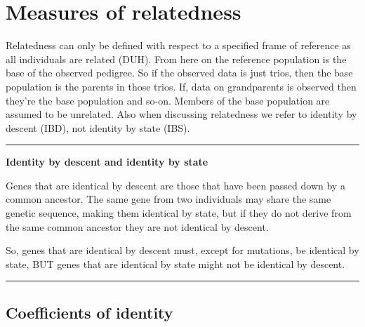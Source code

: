 \documentclass[
]{book}
\begin{document}
\hypertarget{measures-of-relatedness}{%
\section{Measures of relatedness}\label{measures-of-relatedness}}

Relatedness can only be defined with respect to a specified frame of reference as all individuals are related (DUH). From here on the reference population is the base of the observed pedigree. So if the observed data is just trios, then the base population is the parents in those trios. If, data on grandparents is observed then they're the base population and so-on. Members of the base population are assumed to be unrelated. Also when discussing relatedness we refer to identity by descent (IBD), not identity by state (IBS).

\begin{center}\rule{0.5\linewidth}{0.5pt}\end{center}

\textbf{Identity by descent and identity by state}

Genes that are identical by descent are those that have been passed down by a common ancestor. The same gene from two individuals may share the same genetic sequence, making them identical by state, but if they do not derive from the same common ancestor they are not identical by descent.

So, genes that are identical by descent must, except for mutations, be identical by state, BUT genes that are identical by state might not be identical by descent.

\begin{center}\rule{0.5\linewidth}{0.5pt}\end{center}

\hypertarget{coefficients-of-identity}{%
\subsection{Coefficients of identity}\label{coefficients-of-identity}}
\end{document}
